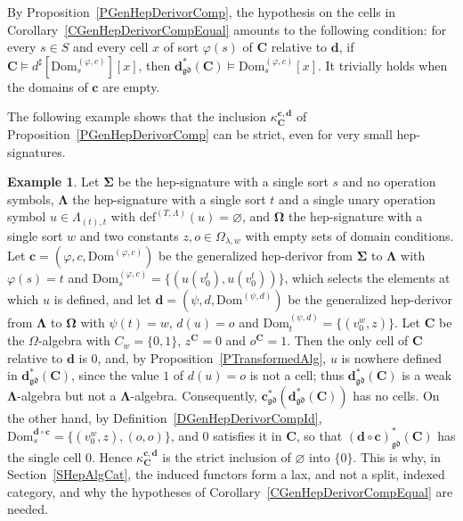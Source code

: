 \documentclass[a4paper, reqno]{amsbook}
\newcommand{\sig}[1]{\mathbf{#1}}             %
\newcommand{\Dom}{\mathrm{Dom}}
\newcommand{\gd}{\mathfrak{gd}}              %
\theoremstyle{plain}
\theoremstyle{definition}
\newtheorem{example}[theorem]{Example}
\begin{document}
By Proposition~\ref{PGenHepDerivorComp}, the hypothesis on the cells in Corollary~\ref{CGenHepDerivorCompEqual} amounts to the following condition: for every $s\in S$ and every cell $x$ of sort $\varphi(s)$ of $\mathbf{C}$ relative to $\mathbf{d}$, if $\mathbf{C}\models d^{\sharp}[\Dom^{(\varphi,c)}_{s}][x]$, then $\mathbf{d}^{\ast}_{\gd}(\mathbf{C})\models\Dom^{(\varphi,c)}_{s}[x]$.
It trivially holds when the domains of $\mathbf{c}$ are empty.

The following example shows that the inclusion $\kappa^{\mathbf{c},\mathbf{d}}_{\mathbf{C}}$ of Proposition~\ref{PGenHepDerivorComp} can be strict, even for very small hep-signatures.

\begin{example}\label{EStrictComparison}
Let $\sig{\Sigma}$ be the hep-signature with a single sort $s$ and no operation symbols, $\sig{\Lambda}$ the hep-signature with a single sort $t$ and a single unary operation symbol $u\in\Lambda_{(t),t}$ with $\mathrm{def}^{(T,\Lambda)}(u)=\varnothing$, and $\sig{\Omega}$ the hep-signature with a single sort $w$ and two constants $z,o\in\Omega_{\lambda,w}$ with empty sets of domain conditions.
Let $\mathbf{c}=(\varphi,c,\Dom^{(\varphi,c)})$ be the generalized hep-derivor from $\sig{\Sigma}$ to $\sig{\Lambda}$ with $\varphi(s)=t$ and $\Dom^{(\varphi,c)}_{s}=\{(u(v^{t}_{0}),u(v^{t}_{0}))\}$, which selects the elements at which $u$ is defined, and let $\mathbf{d}=(\psi,d,\Dom^{(\psi,d)})$ be the generalized hep-derivor from $\sig{\Lambda}$ to $\sig{\Omega}$ with $\psi(t)=w$, $d(u)=o$ and $\Dom^{(\psi,d)}_{t}=\{(v^{w}_{0},z)\}$.
Let $\mathbf{C}$ be the $\Omega$-algebra with $C_{w}=\{0,1\}$, $z^{\mathbf{C}}=0$ and $o^{\mathbf{C}}=1$.
Then the only cell of $\mathbf{C}$ relative to $\mathbf{d}$ is $0$, and, by Proposition~\ref{PTransformedAlg}, $u$ is nowhere defined in $\mathbf{d}^{\ast}_{\gd}(\mathbf{C})$, since the value $1$ of $d(u)=o$ is not a cell; thus $\mathbf{d}^{\ast}_{\gd}(\mathbf{C})$ is a weak $\sig{\Lambda}$-algebra but not a $\sig{\Lambda}$-algebra.
Consequently, $\mathbf{c}^{\ast}_{\gd}(\mathbf{d}^{\ast}_{\gd}(\mathbf{C}))$ has no cells.
On the other hand, by Definition~\ref{DGenHepDerivorCompId}, $\Dom^{\mathbf{d}\circ\mathbf{c}}_{s}=\{(v^{w}_{0},z),(o,o)\}$, and $0$ satisfies it in $\mathbf{C}$, so that $(\mathbf{d}\circ\mathbf{c})^{\ast}_{\gd}(\mathbf{C})$ has the single cell $0$.
Hence $\kappa^{\mathbf{c},\mathbf{d}}_{\mathbf{C}}$ is the strict inclusion of $\varnothing$ into $\{0\}$.
This is why, in Section~\ref{SHepAlgCat}, the induced functors form a lax, and not a split, indexed category, and why the hypotheses of Corollary~\ref{CGenHepDerivorCompEqual} are needed.
\end{example}
\end{document}
